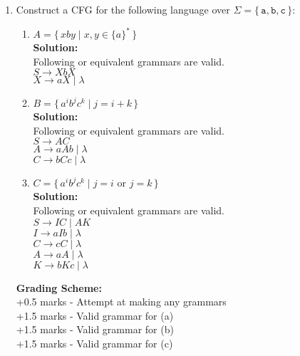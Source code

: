 \documentclass[11pt, article, oneside]{memoir}
\newcommand{\set}[1]{\{\, #1\, \}}
\begin{document}
\begin{enumerate}
    \item
        Construct a CFG for the following language over \(\Sigma = \set{\texttt{a}, \texttt{b}, \texttt{c}}\):
        \begin{enumerate}
            \item
                \(A = \set{xby \mid x, y \in \{a\}^*}\) 
                \\\textbf{Solution:}
                \\Following or equivalent grammars are valid.
                \\\(S \rightarrow XbX\)
                \\\(X \rightarrow aX \mid \lambda\)
            \item
                \(B = \set{ {a^i}{b^j}{c^k} \mid j = i + k}\)
                \\\textbf{Solution:}
                \\Following or equivalent grammars are valid.
                \\\(S \rightarrow AC\)
                \\\(A \rightarrow aAb \mid \lambda\)
                \\\(C \rightarrow bCc \mid \lambda\)
            \item
                \(C = \set{ {a^i}{b^j}{c^k} \mid j = i \text{ or } j = k}\)
                \\\textbf{Solution:}
                \\Following or equivalent grammars are valid.
                \\\(S \rightarrow IC \mid AK\)
                \\\(I \rightarrow aIb \mid \lambda\)
                \\\(C \rightarrow cC \mid \lambda\)
                \\\(A \rightarrow aA \mid \lambda\)
                \\\(K \rightarrow bKc \mid \lambda\)
        \end{enumerate}

        \textbf{Grading Scheme:}
        \\+0.5 marks - Attempt at making any grammars
        \\+1.5 marks - Valid grammar for (a)
        \\+1.5 marks - Valid grammar for (b)
        \\+1.5 marks - Valid grammar for (c)
        

\end{enumerate}
\end{document}
